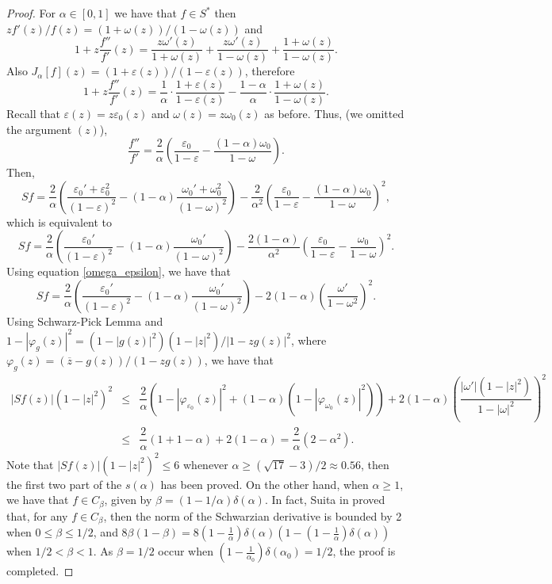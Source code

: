 \documentclass[reqno]{amsart}
\theoremstyle{plain}
\theoremstyle{definition}
\begin{document}
\begin{proof} For $\alpha\in[0,1]$ we have that $f\in S^\ast$ then $zf'(z)/f(z)=(1+\omega(z))/(1-\omega(z))$ and
\begin{equation}\label{conv-omega}1+z\frac{f''}{f'}(z)=\frac{z\omega'(z)}{1+\omega(z)}+\frac{z\omega'(z)}{1-\omega(z)}+\frac{1+\omega(z)}{1-\omega(z)}.\end{equation}
Also $J_\alpha[f](z)=(1+\varepsilon(z))/(1-\varepsilon(z))$, therefore
\begin{equation}\label{conv-eps}1+z\frac{f''}{f'}(z)=\frac1\alpha\cdot \frac{1+\varepsilon(z)}{1-\varepsilon(z)}-\frac{1-\alpha}{\alpha}\cdot\frac{1+\omega(z)}{1-\omega(z)}.\end{equation}
Recall that $\varepsilon(z)=z\varepsilon_0(z)$ and $\omega(z)=z\omega_0(z)$ as before. Thus, (we omitted the argument $(z)$), $$\frac{f''}{f'}=\frac2\alpha\left(\frac{\varepsilon_0}{1-\varepsilon}-\frac{(1-\alpha)\omega_0}{1-\omega}\right).$$ Then,
$$ Sf=\frac{2}{\alpha}\left(\frac{\varepsilon_0'+\varepsilon_0^2}{(1-\varepsilon)^2}-(1-\alpha)\frac{\omega_0'+\omega_0^2}{(1-\omega)^2}\right)-\dfrac{2}{\alpha^2}\left(\dfrac{\varepsilon_0}{1-\varepsilon}-\dfrac{(1-\alpha)\omega_0}{1-\omega}\right)^2,$$
which is equivalent to $$Sf=\frac{2}{\alpha}\left(\frac{\varepsilon_0'}{(1-\varepsilon)^2}-(1-\alpha)\frac{\omega_0'}{(1-\omega)^2}\right)-\dfrac{2(1-\alpha)}{\alpha^2}\left(\dfrac{\varepsilon_0}{1-\varepsilon}-\dfrac{\omega_0}{1-\omega}\right)^2.$$
Using equation \eqref{omega_epsilon}, we have that $$Sf=\frac{2}{\alpha}\left(\frac{\varepsilon_0'}{(1-\varepsilon)^2}-(1-\alpha)\frac{\omega_0'}{(1-\omega)^2}\right)-2(1-\alpha)\left(\dfrac{\omega'}{1-\omega^2}\right)^2.$$
Using Schwarz-Pick Lemma and $1-|\varphi_g(z)|^2=(1-|g(z)|^2)(1-|z|^2)/|1-zg(z)|^2$, where $\varphi_g(z)=(\overline z-g(z))/(1-zg(z))$, we have that
\begin{equation}\label{bound-sf}\begin{array}{lll}
 |Sf(z)|(1-|z|^2)^2 &\leq & \dfrac{2}{\alpha}\left(1-|\varphi_{\varepsilon_0}(z)|^2+(1-\alpha)(1-|\varphi_{\omega_0}(z)|^2)\right)+2(1-\alpha)\left(\dfrac{|\omega'|(1-|z|^2)}{1-|\omega|^2}\right)^2\\[0.3cm]
  &\leq  & \dfrac{2}{\alpha}\left(1+1-\alpha\right)+2(1-\alpha)= \dfrac{2}{\alpha}\left(2-\alpha^2\right).
\end{array} \end{equation}
Note that $|Sf(z)|(1-|z|^2)^2 \leq 6$ whenever $\alpha \geq (\sqrt{17}-3)/2 \approx 0.56$, then the first two part of the $s(\alpha)$ has been proved. On the other hand, when $\alpha\geq 1$, we have that $f\in C_\beta$, given by $\beta=(1-1/\alpha)\delta(\alpha)$. In fact, Suita in \cite{Sui1996} proved that, for any $f\in C_\beta$, then the norm of the Schwarzian derivative is bounded by 2 when $0\leq \beta\leq 1/2$, and $8\beta(1-\beta)=8\left(1-\frac1\alpha\right)\delta(\alpha)\left(1-\left(1-\frac1\alpha\right)\delta(\alpha)\right)$ when $1/2<\beta<1$. As $\beta=1/2$ occur when $\left(1-\frac{1}{\alpha_0}\right)\delta(\alpha_0)=1/2$, the proof is completed.
\end{proof}
\end{document}
